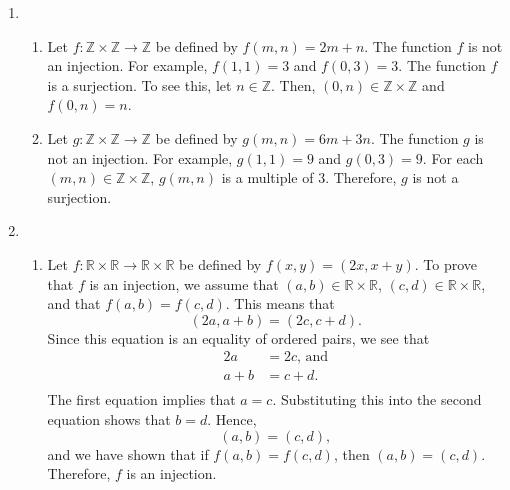\begin{enumerate}
\item \begin{enumerate}
\item Let $f:\mathbb{Z} \times \mathbb{Z} \to \mathbb{Z}$ be defined by  
$f( {m, n} ) = 2m + n$.  The function $f$ is not an injection.  For example, 
$f ( 1, 1 ) = 3$ and $f ( 0, 3 ) = 3$.  The function $f$ is a surjection.  To see this, let $n \in \mathbb{Z}$.  Then, 
$( 0, n ) \in \mathbb{Z} \times \mathbb{Z}$ and 
$f ( 0, n ) = n$.

\item Let $g:\mathbb{Z} \times \mathbb{Z} \to \mathbb{Z}$ be defined by  
$g( {m, n} ) = 6m + 3n$.  The function $g$ is not an injection.  For example, 
$g ( 1, 1 ) = 9$ and $g ( 0, 3 ) = 9$.  For each 
$( m, n ) \in \mathbb{Z} \times \mathbb{Z}$, $g ( m, n )$ is a multiple of 3.  Therefore, $g$ is not a surjection.
\end{enumerate}



\item \begin{enumerate}
\item Let 
$f:\mathbb{R} \times \mathbb{R} \to \mathbb{R} \times \mathbb{R}$ be defined by  
$f( {x, y} ) = ( {2x, x + y} )$. To prove that $f$  is an injection, we assume that  
$( {a, b} ) \in \mathbb{R} \times \mathbb{R}$, 
$( {c, d} ) \in \mathbb{R} \times \mathbb{R}$, and that  
$f( {a, b} ) = f( {c, d} )$.  This means that
\[
( {2a, a + b} ) = ( {2c, c + d} ).
\]
Since this equation is an equality of ordered pairs, we see that
\[
\begin{aligned}
       2a &= 2c \text{, and} \\ 
    a + b &= c + d. \\ 
\end{aligned}
\]
The first equation implies that $a = c$.  Substituting this into the second equation shows that 
$b = d$.  Hence, 
\[
( {a, b} ) = ( {c, d} ),
\]
and we have shown that if $f( {a, b} ) = f( {c, d} )$, then  
$( {a, b} ) = ( {c, d} )$.  Therefore,  $f$  is an injection.


\end{enumerate}
\end{enumerate}
